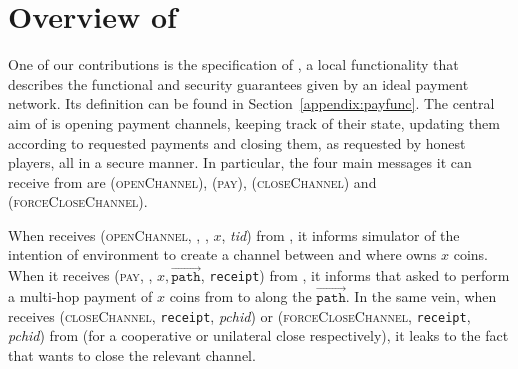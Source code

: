 \section{Overview of \fpaynet{}}
\label{sec:ov-paynet}
  One of our contributions is the specification of \fpaynet, a local functionality
  that describes the functional and security guarantees given by an ideal
  payment network. Its definition can be found in Section~\ref{appendix:payfunc}. The central aim of \fpaynet{} is opening payment
  channels, keeping track of their state, updating them according to requested
  payments and closing them, as requested by honest players, all in a secure
  manner. In particular, the four main messages it can receive from \alice{}
  are (\textsc{openChannel}), (\textsc{pay}), (\textsc{closeChannel}) and
  (\textsc{forceCloseChannel}).

  When \fpaynet{} receives (\textsc{openChannel}, \alice, \bob, $x$,
  \textit{tid}) from \alice, it informs simulator \simulator{} of the
  intention of environment \environment{} to create a channel between
  \alice{} and \bob{} where \alice{} owns $x$ coins. When it receives
  (\textsc{pay}, \bob, $x, \overrightarrow{\mathtt{path}}$, \texttt{receipt})
  from \alice, it informs \simulator{} that \environment{} asked to perform a
  multi-hop payment of $x$ coins from \alice{} to \bob{} along the
  $\overrightarrow{\mathtt{path}}$. In the same vein, when \fpaynet{}
  receives (\textsc{closeChannel}, \texttt{receipt}, \textit{pchid}) or
  (\textsc{forceCloseChannel}, \texttt{receipt}, \textit{pchid}) from
  \alice{} (for a cooperative or unilateral close respectively), it
  leaks to \simulator{} the fact that \environment{} wants to close the relevant
  channel.

